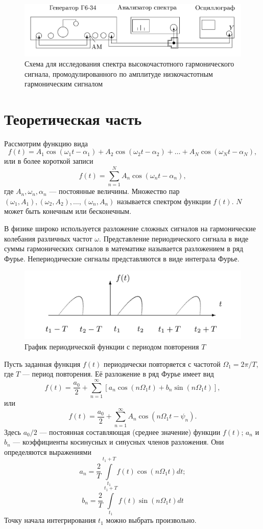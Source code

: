 \documentclass[a4paper, fontsize=14pt]{article}
\begin{document}
\begin{figure}[H]
\center
\includegraphics[scale=0.2]{ust3.png}
\caption{Схема для исследования спектра высокочастотного гармонического сигнала, промодулированного по амплитуде низкочастотным гармоническим сигналом}
\end{figure}
\section*{Теоретическая часть}
Рассмотрим функцию вида 
\[
	f(t)=A_{1} \cos \left(\omega_{1} t-\alpha_{1}\right)+A_{2} \cos \left(\omega_{2} t-\alpha_{2}\right)+\ldots+A_{N} \cos \left(\omega_{N} t-\alpha_{N}\right),
\]
или в более короткой записи
\[
	f(t)=\sum_{n=1}^{N} A_{n} \cos \left(\omega_{n} t-\alpha_{n}\right),
\]
где $A_n, \omega_n, \alpha_n$ --- постоянные величины. Множество пар $(\omega_1, A_1), (\omega_2, A_2), \ldots, (\omega_n, A_n)$ называется спектром функции $f(t)$. $N$ может быть конечным или бесконечным.

В физике широко используется разложение сложных сигналов на гармонические колебания различных частот $\omega$. Представление периодического сигнала в виде суммы гармонических сигналов в математике называется разложением в ряд Фурье. Непериодические сигналы представляются в виде интеграла Фурье.
\begin{figure}[H]
\center
\includegraphics[scale=0.3]{gr0.png}
\caption{График периодической функции с периодом повторения $T$}
\end{figure}
Пусть заданная функция $f(t)$ периодически повторяется с частотой $\Omega_1 = 2 \pi / T$, где $T$ --- период повторения. Её разложение в ряд Фурье имеет вид
\[
f(t)=\frac{a_{0}}{2}+\sum_{n=1}^{\infty}\left[a_{n} \cos \left(n \Omega_{1} t\right)+b_{n} \sin \left(n \Omega_{1} t\right)\right],
\]
или
\[
	f(t)=\frac{a_{0}}{2}+\sum_{n=1}^{\infty} A_n \cos (n \Omega_1 t - \psi_n).
\]
Здесь $a_0 / 2$ --- постоянная составляющая (среднее значение) функции $f(t)$; $a_n$ и $b_n$ --- коэффициенты косинусных и синусных членов разложения. Они определяются выражениями
\[
		a_{n}=\frac{2}{T} \int\limits_{t_{1}}^{t_{1}+T} f(t) \cos \left(n \Omega_{1} t\right) d t;
\]
\[
b_{n}=\frac{2}{T} \int\limits_{t_{1}}^{t_{1}+T} f(t) \sin \left(n \Omega_{1} t\right) d t
\]
Точку начала интегрирования $t_1$ можно выбрать произвольно.
\end{document}
